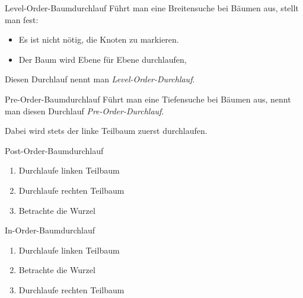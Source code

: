 \documentclass[german]{../spicker}
\begin{document}
\begin{defi}{Level-Order-Baumdurchlauf}
    Führt man eine Breitensuche bei Bäumen aus, stellt man fest:
    \begin{itemize}
        \item Es ist nicht nötig, die Knoten zu markieren.
        \item Der Baum wird Ebene für Ebene durchlaufen,
    \end{itemize}

    Diesen Durchlauf nennt man \emph{Level-Order-Durchlauf}.
\end{defi}

\begin{defi}{Pre-Order-Baumdurchlauf}
    Führt man eine Tiefensuche bei Bäumen aus, nennt man diesen Durchlauf \emph{Pre-Order-Durchlauf}.

    Dabei wird stets der linke Teilbaum zuerst durchlaufen.
\end{defi}

\begin{defi}{Post-Order-Baumdurchlauf}
    \begin{enumerate}
        \item Durchlaufe linken Teilbaum
        \item Durchlaufe rechten Teilbaum
        \item Betrachte die Wurzel
    \end{enumerate}
\end{defi}

\begin{defi}{In-Order-Baumdurchlauf}
    \begin{enumerate}
        \item Durchlaufe linken Teilbaum
        \item Betrachte die Wurzel
        \item Durchlaufe rechten Teilbaum
    \end{enumerate}
\end{defi}
\end{document}
